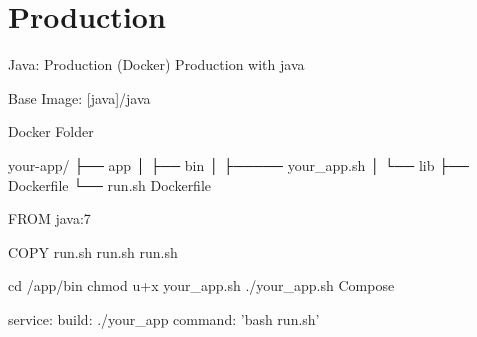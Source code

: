 \section{Production}

Java: Production (Docker)
Production with java

Base Image: [java]/java

Docker Folder

your-app/
├── app
│   ├── bin
│   ├───── your_app.sh
│   └── lib
├── Dockerfile
└── run.sh
Dockerfile

FROM java:7

COPY run.sh run.sh
run.sh

cd /app/bin
chmod u+x your_app.sh
./your_app.sh
Compose

 service:
  build: ./your_app
  command: 'bash run.sh'

















